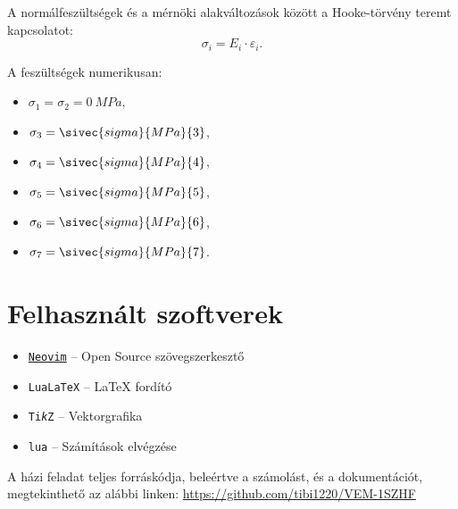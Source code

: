 \documentclass[a4paper, 12pt]{scrartcl}
\begin{document}
A normálfeszültségek és a mérnöki alakváltozások között a Hooke-törvény teremt
kapcsolatot:
\begin{equation}
  \sigma_i = E_i \cdot \varepsilon_i.
  \label{eq:Hooke}
\end{equation}

A feszültségek numerikusan:
\begin{multicols}{3}
  \begin{itemize}
    \item $\sigma_1 = \sigma_2 = \SI{0}{MPa},$
    \item $\sigma_3 = \sivec{sigma}{MPa}{3}$,
    \item $\sigma_4 = \sivec{sigma}{MPa}{4}$,
    \item $\sigma_5 = \sivec{sigma}{MPa}{5}$,
    \item $\sigma_6 = \sivec{sigma}{MPa}{6}$,
    \item $\sigma_7 = \sivec{sigma}{MPa}{7}$.
  \end{itemize}
\end{multicols}




\vfill

\section*{Felhasznált szoftverek}

\begin{itemize}
  \item \href{https://neovim.io}{\texttt{Neovim}}
        \tabto{3.9cm} – \tabto{4.7cm}
        Open Source szövegszerkesztő

  \item \texttt{Lua\LaTeX}
        \tabto{3.9cm} – \tabto{4.7cm}
        \LaTeX{} fordító

  \item \texttt{Ti\textit{k}Z}
        \tabto{3.9cm} – \tabto{4.7cm}
        Vektorgrafika

  \item \texttt{lua}
        \tabto{3.9cm} – \tabto{4.7cm}
        Számítások elvégzése
\end{itemize}

A házi feladat teljes forráskódja, beleértve a számolást, és a dokumentációt,
megtekinthető az alábbi linken:
\href{https://github.com/tibi1220/VEM-1SZHF}{https://github.com/tibi1220/VEM-1SZHF}
\end{document}

